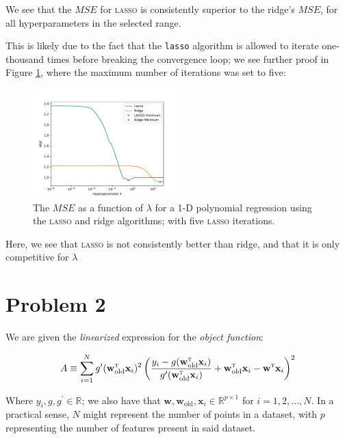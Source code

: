 \documentclass[a4paper,10pt,english]{article}
\begin{document}
\begin{multicols*}{2}
We see that the $MSE$ for \textsc{lasso} is consistently superior to the ridge's $MSE$, for all hyperparameters in the selected range.  

This is likely due to the fact that the \texttt{lasso} algorithm is allowed to iterate one-thousand times before breaking the convergence loop; we see further proof in Figure \ref{fig_2}, where the maximum number of iterations was set to five:

\begin{figure}[H]
	\centering  
	\includegraphics[width = 0.5\textwidth, center]{../a_5_iter.pdf}
	\caption{The $MSE$ as a function of $\lambda$ for a 1-D polynomial regression using the \textsc{lasso} and ridge algorithms; with five \textsc{lasso} iterations.}
	\label{fig_2}
\end{figure}

Here, we see that \textsc{lasso} is not consistently better than ridge, and that it is only competitive for $\lambda $

\section*{Problem 2}

We are given the \textit{linearized} expression for the \textit{object function}:

\begin{equation}
\label{eq_0}
A \equiv \sum_{i=1}^{N} g^\prime(\mathbf{w}_\text{old}^\textsc{t} \mathbf{x}_i)^2 \left( \frac{y_i - g(\mathbf{w}_\text{old}^\textsc{t} \mathbf{x}_i)}{g^\prime(\mathbf{w}_\text{old}^\textsc{t} \mathbf{x}_i)} + \mathbf{w}_\text{old}^\textsc{t} \mathbf{x}_i - \mathbf{w}^\textsc{t} \mathbf{x}_i \right)^2
\end{equation}

Where $y_i, g, g^\prime \in \mathbb{R}$; we also have that $\mathbf{w}, \mathbf{w}_\text{old}, \mathbf{x}_i \in \mathbb{R}^{p \times 1}$ for $i = 1,2,...,N$.  In a practical sense, $N$ might represent the number of points in a dataset, with $p$ representing the number of features present in said dataset.


\end{multicols*}
\end{document}
